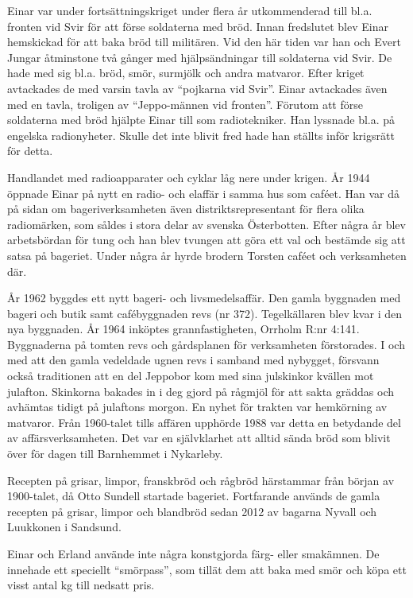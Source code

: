 Einar var under fortsättningskriget under flera år utkommenderad till bl.a. fronten vid Svir för att förse soldaterna med bröd. Innan fredslutet blev Einar hemskickad för att baka bröd till militären. Vid den här tiden var han och Evert Jungar åtminstone två gånger med hjälpsändningar till soldaterna vid Svir. De hade med sig bl.a. bröd, smör, surmjölk och andra matvaror. Efter kriget avtackades de med varsin tavla av ``pojkarna vid Svir''. Einar avtackades även med en tavla, troligen av ``Jeppo-männen vid fronten''. Förutom att förse soldaterna med bröd hjälpte Einar till som radiotekniker. Han lyssnade bl.a. på engelska radionyheter. Skulle det inte blivit fred hade han ställts inför krigsrätt för detta.

Handlandet med radioapparater och cyklar låg nere under krigen. År 1944 öppnade Einar på nytt en radio- och elaffär i samma hus som caféet. Han var då på sidan om bageriverksamheten även distriktsrepresentant för flera olika radiomärken, som såldes i stora delar av svenska Österbotten. Efter några år blev arbetsbördan för tung och han blev tvungen att göra ett val och bestämde sig att satsa på bageriet. Under några år hyrde brodern Torsten caféet och verksamheten där.

År 1962 byggdes ett nytt bageri- och livsmedelsaffär. Den gamla byggnaden med bageri och butik samt cafébyggnaden revs (nr 372). Tegelkällaren blev kvar i den nya byggnaden.  År 1964 inköptes grannfastigheten, Orrholm R:nr 4:141. Byggnaderna på tomten revs och gårdsplanen för verksamheten förstorades. I och med att den gamla vedeldade ugnen revs i samband med nybygget, försvann också traditionen att en del Jeppobor kom med sina julskinkor kvällen mot julafton. Skinkorna bakades in i deg gjord på rågmjöl för att sakta gräddas och avhämtas tidigt på julaftons morgon. En nyhet för trakten var hemkörning av matvaror. Från 1960-talet tills affären upphörde 1988 var detta en betydande del av affärsverksamheten. Det var en självklarhet att alltid sända bröd som blivit över för dagen till Barnhemmet i Nykarleby.

Recepten på grisar, limpor, franskbröd och rågbröd härstammar från början av 1900-talet, då Otto Sundell startade bageriet. Fortfarande används de gamla recepten på grisar, limpor och blandbröd sedan 2012 av bagarna Nyvall och Luukkonen i Sandsund.

Einar och Erland använde inte några konstgjorda färg- eller smakämnen. De innehade ett speciellt ``smörpass'', som tillät dem att baka med smör och köpa ett visst antal kg till nedsatt pris.

